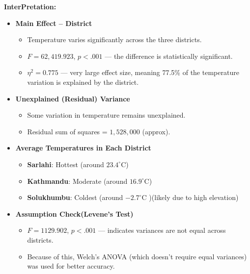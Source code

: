 \textbf{InterPretation:}
\begin{itemize}
    \item \textbf{Main Effect – District}
    \begin{itemize}
        \item Temperature varies significantly across the three districts.
        \item $F = 62{,}419.923$, $p < .001$ — the difference is statistically significant.
        \item $\eta^2 = 0.775$ — very large effect size, meaning 77.5\% of the temperature variation is explained by the district.
    \end{itemize}
    
    \item \textbf{Unexplained (Residual) Variance}
    \begin{itemize}
        \item Some variation in temperature remains unexplained.
        \item Residual sum of squares = $1{,}528{,}000$ (approx).
    \end{itemize}
    
    \item \textbf{Average Temperatures in Each District}
    \begin{itemize}
        \item \textbf{Sarlahi}: Hottest (around $23.4^\circ$C)
        \item \textbf{Kathmandu}: Moderate (around $16.9^\circ$C)
        \item \textbf{Solukhumbu}: Coldest (around $-2.7^\circ$C )(likely due to high elevation)
    \end{itemize}
    
    \item \textbf{Assumption Check(Levene’s Test)}
    \begin{itemize}
        \item $F = 1129.902$, $p < .001$ — indicates variances are not equal across districts.
        \item Because of this, Welch’s ANOVA (which doesn’t require equal variances) was used for better accuracy.
    \end{itemize}
\end{itemize}
